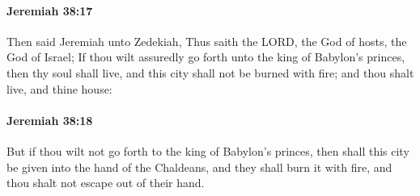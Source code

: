 		\paragraph{Jeremiah 38:17} %
			\label{JEREMIAH-38-17}

			Then said Jeremiah unto Zedekiah, Thus saith the LORD, the God of hosts, the God of Israel; If thou wilt assuredly go forth unto the king of Babylon’s princes, then thy soul shall live, and this city shall not be burned with fire; and thou shalt live, and thine house:


		\paragraph{Jeremiah 38:18} %
			\label{JEREMIAH-38-18}

			But if thou wilt not go forth to the king of Babylon’s princes, then shall this city be given into the hand of the Chaldeans, and they shall burn it with fire, and thou shalt not escape out of their hand.

